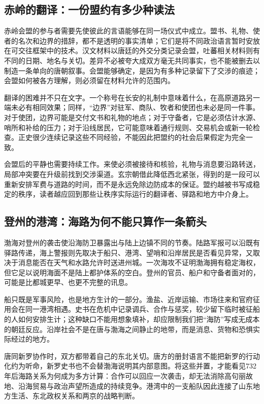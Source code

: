 \subsection{赤岭的翻译：一份盟约有多少种读法}
赤岭会盟的参与者需要先使彼此的言语能够在同一场仪式中成立。盟书、礼物、使者的名次和边界的措辞，都不是透明的事实清单；它们是将不同政治语言暂时安放在可交往框架中的技术。汉文材料以唐廷的外交分类记录会盟，吐蕃相关材料则有不同的日期、地名与关切。差异不必被夸大成双方毫无共同事实，也不能被删去以制造一条单向的唐朝叙事。会盟能够确定，是因为有多种记录留下了交涉的痕迹；会盟如何被各方理解，则必须留在材料允许的范围内。

翻译的困难并不只在文字。一个称号在长安的礼制中意味着什么，在高原道路另一端未必有相同效果；同样，“边界”对驻军、商队、牧者和使团也未必是同一件事。对于使团，边界可能是交付文书和礼物的地点；对于守备者，它是必须估计水源、哨所和补给的压力；对于沿线居民，它可能意味着通行规则、交易机会或新一轮检查。正史很少连续记录这些不同经验，不能因此把盟约的社会后果假定为完全一致。

会盟后的平静也需要持续工作。来使必须被接待和核验，礼物与消息要沿路转送，局部冲突要在升级前找到交涉渠道。玄宗朝借此降低西北紧张，得到的是一段可以重新安排军费与道路的时间，而不是永远免除边防成本的保证。盟约越被书写成稳定的秩序，读者越应回到那些让秩序实际运行的翻译者、驿路和地方中介身上。

\subsection{登州的港湾：海路为何不能只算作一条箭头}
渤海对登州的袭击使沿海防卫暴露出与陆上边镇不同的节奏。陆路军报可以沿既有驿路传递，海上警报则先取决于船只、港湾、望哨和沿岸居民是否看见异常，又取决于消息能否在天气和水路允许时送进州城。一次海攻不证明渤海拥有稳定海权，但它足以说明海面不是陆上都护体系的空白。登州的官员、船户和守备者面对的，可能是比都城更早、也更不完整的讯息。

船只既是军事风险，也是地方生计的一部分。渔盐、近岸运输、市场往来和官府征用会在同一港湾相遇。史书在危机中记录调兵、合作与惩奖，较少留下临时被征船的人如何安排生计；这种缺口不能用想象填补，却应限制我们把“海防”写成无成本的朝廷反应。沿岸社会不是在唐与渤海之间静止的地带，而是消息、货物和恐惧实际经过的地方。

唐同新罗协作时，双方都带着自己的东北关切。唐方的册封语言不能把新罗的行动化约为听命，新罗史书也不会替渤海说明其内部意图。将这些并置，才能看见732年后海路关系为何成为多方计算：合作可以回应一次袭击，却无法消除高句丽故地、沿海贸易与政治声望所造成的持续竞争。港湾中的一支船队因此连接了山东地方生活、东北政权关系和两京的战略判断。

